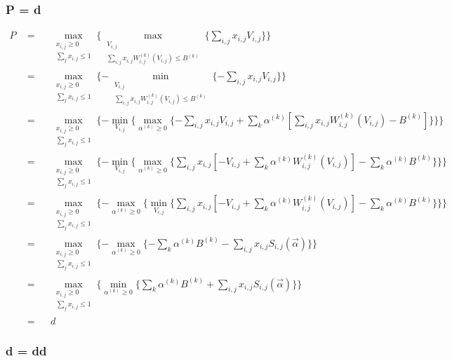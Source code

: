 \documentclass{article}
\theoremstyle{definition}
\newcommand{\sumj}{\sum\limits_j}
\newcommand{\sumk}{\sum\limits_k}
\newcommand{\sumij}{\sum\limits_{i,j}}
\newcommand{\sx}{x_{i,j}}
\newcommand{\sV}{V_{i,j}}
\newcommand{\sW}{W_{i,j}^{(k)}}
\newcommand{\sB}{B^{(k)}}
\newcommand{\salpha}{\alpha^{(k)}}
\newcommand{\sS}{S_{i,j}}
\newcommand{\valpha}{\vec{\alpha}}
\newcommand{\agapresourceconstraint}{\sumij \sx \sW(\sV) \le \sB}
\newcommand{\assignmentconstraint}{\sumj \sx \le 1}
\begin{document}
\begin{CJK}{UTF8}{gbsn}
\subsubsection{P = d}

\begin{align*}
    P     & = &&
        \max\limits_{\substack{ \sx \ge 0 \\ \assignmentconstraint }} \{
        \max\limits_{\substack{ \sV \\ \agapresourceconstraint }} \{
        \sumij \sx \sV \} \} \\
    \quad & = &&
        \max\limits_{\substack{ \sx \ge 0 \\ \assignmentconstraint }} \{
        - \min\limits_{\substack{ \sV \\ \agapresourceconstraint }} \{
        - \sumij \sx \sV \} \} \\
    \quad & = &&
        \max\limits_{\substack{ \sx \ge 0 \\ \assignmentconstraint }} \{
        - \min\limits_{\sV} \{ \max\limits_{\salpha \ge 0} \{
        - \sumij \sx \sV + \sumk \salpha [\sumij \sx \sW(\sV) - B^{(k)}] \} \} \} \\
    \quad & = &&
        \max\limits_{\substack{ \sx \ge 0 \\ \assignmentconstraint }} \{
        - \min\limits_{\sV} \{ \max\limits_{\salpha \ge 0} \{
        \sumij \sx [-\sV + \sumk \salpha \sW(\sV)] - \sumk \salpha B^{(k)} \} \} \} \\
    \quad & = &&
        \max\limits_{\substack{ \sx \ge 0 \\ \assignmentconstraint }} \{
        - \max\limits_{\salpha \ge 0} \{ \min\limits_{\sV} \{
        \sumij \sx [-\sV + \sumk \salpha \sW(\sV)] - \sumk \salpha B^{(k)} \} \} \} \\
    \quad & = &&
        \max\limits_{\substack{ \sx \ge 0 \\ \assignmentconstraint }} \{
        - \max\limits_{\salpha \ge 0} \{ - \sumk \salpha \sB - \sumij \sx \sS(\valpha) \} \} \\
    \quad & = &&
        \max\limits_{\substack{ \sx \ge 0 \\ \assignmentconstraint }} \{
        \min\limits_{\salpha \ge 0} \{ \sumk \salpha \sB + \sumij \sx \sS(\valpha) \} \} \\
    \quad & = && d
\end{align*}

\subsubsection{d = dd}


\end{CJK}
\end{document}
